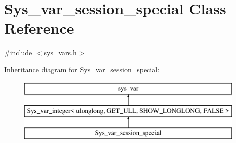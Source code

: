 \hypertarget{classSys__var__session__special}{}\section{Sys\+\_\+var\+\_\+session\+\_\+special Class Reference}
\label{classSys__var__session__special}


{\ttfamily \#include $<$sys\+\_\+vars.\+h$>$}

Inheritance diagram for Sys\+\_\+var\+\_\+session\+\_\+special\+:\begin{figure}[H]
\begin{center}
\leavevmode
\includegraphics[height=3.000000cm]{classSys__var__session__special}
\end{center}
\end{figure}

